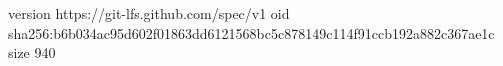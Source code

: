 version https://git-lfs.github.com/spec/v1
oid sha256:b6b034ac95d602f01863dd6121568bc5c878149c114f91ccb192a882c367ae1c
size 940
